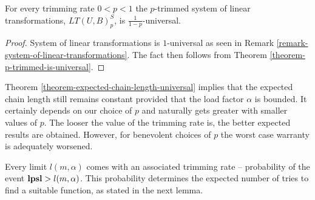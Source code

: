 \begin{corollary}
\label{corollary-trimming-linear}
For every trimming rate $0 < p < 1$ the $p$-trimmed system of linear transformations, $LT(U, B)_p^S$, is $\frac{1}{1 - p}$-universal.
\end{corollary}
\begin{proof}
System of linear transformations is $1$-universal as seen in Remark \ref{remark-system-of-linear-transformations}. The fact then follows from  Theorem \ref{theorem-p-trimmed-is-universal}.
\end{proof}

Theorem \ref{theorem-expected-chain-length-universal} implies that the expected chain length still remains constant provided that the load factor $\alpha$ is bounded. It certainly depends on our choice of $p$ and naturally gets greater with smaller values of $p$. The looser the value of the trimming rate is, the better expected results are obtained. However, for benevolent choices of $p$ the worst case warranty is adequately worsened.

Every limit $l(m, \alpha)$ comes with an associated trimming rate -- probability of the event $\mathbf{lpsl} > l(m, \alpha)$. This probability determines the expected number of tries to find a suitable function, as stated in the next lemma.

